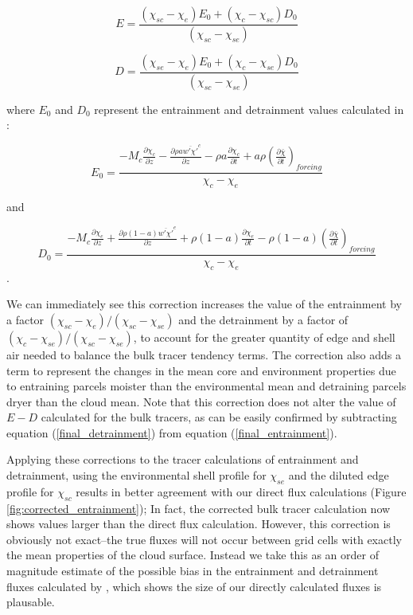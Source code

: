 \documentclass[12pt]{article}
\begin{document}
\begin{equation}
  \label{eq:final_entrainment}
    E = \frac{(\chi_{sc} - \chi_e)E_0 + (\chi_c - \chi_{sc})D_0}
             {(\chi_{sc} - \chi_{se})}
\end{equation}

\begin{equation}
  \label{eq:final_detrainment}
    D = \frac{(\chi_{se} - \chi_e)E_0 + (\chi_c - \chi_{se})D_0}
             {(\chi_{sc} - \chi_{se})}
\end{equation}

where $E_0$ and $D_0$ represent the entrainment and detrainment values
calculated in \cite{Siebesma1995}:

\begin{equation}
  \label{eq:E_0_equation}
    E_0 = \frac{- M_c \frac{\partial \chi_c}{\partial z}
        - \frac{\partial \rho a \overline{w' \chi'}^c}{\partial z}
        - \rho a \frac{\partial \chi_c}{\partial t}
        + a \rho \left(\frac{\partial \bar{\chi}}{\partial t}\right)_{forcing}}
        {\chi_c - \chi_e}
\end{equation}

and

\begin{equation}
  \label{eq:D_0_equation}
    D_0 = \frac{- M_c \frac{\partial \chi_e}{\partial z}
        + \frac{\partial \rho (1 - a) \overline{w' \chi'}^e}{\partial z}
        + \rho (1 - a) \frac{\partial \chi_e}{\partial t}
        - \rho (1 - a) \left(\frac{\partial \bar{\chi}}{\partial t}\right)_{forcing}}
        {\chi_c - \chi_e}
\end{equation}.

We can immediately see this correction increases the value of the entrainment 
by a factor $(\chi_{sc} - \chi_e)/(\chi_{sc} - \chi_{se})$ and the detrainment 
by a factor of $(\chi_c - \chi_{se})/(\chi_{sc} - \chi_{se})$, to account for 
the greater quantity of edge and shell air needed to balance the bulk tracer 
tendency terms.  The correction also adds a term to represent the changes in 
the mean core and environment properties due to entraining parcels moister than 
the environmental mean and detraining parcels dryer than the cloud mean.  Note 
that this correction does not alter the value of $E-D$ calculated for the bulk 
tracers, as can be easily confirmed by subtracting equation 
(\ref{final_detrainment}) from equation (\ref{final_entrainment}).

Applying these corrections to the tracer calculations of entrainment and 
detrainment, using the environmental shell profile for $\chi_{se}$ and the 
diluted edge profile for $\chi_{sc}$ results in better agreement with our 
direct flux calculations (Figure \ref{fig:corrected_entrainment}); In fact, the 
corrected bulk tracer calculation now shows values larger than the direct flux
calculation.  However, this correction is obviously not exact--the true fluxes
will not occur between grid cells with exactly the mean properties of the cloud
surface.  Instead we take this as an order of magnitude estimate of the possible
bias in the entrainment and detrainment fluxes calculated by 
\cite{siebesma1995}, which shows the size of our directly calculated fluxes is 
plausable.
\end{document}
